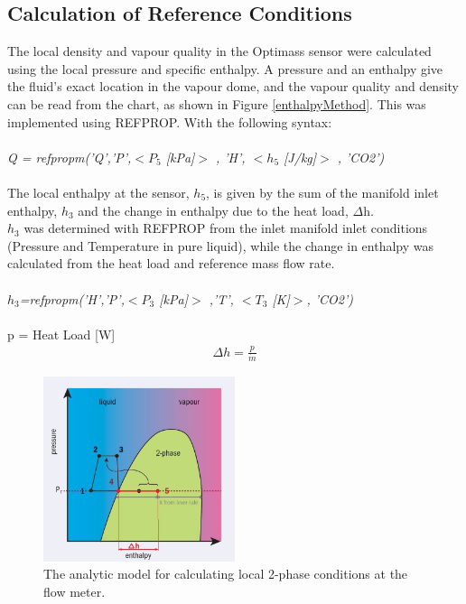 \documentclass{report}
\begin{document}
\subsection{Calculation of Reference Conditions}
The local density and vapour quality in the Optimass sensor were calculated using the local pressure and specific enthalpy. 
A pressure and an enthalpy give the fluid's exact location in the vapour dome, and the vapour quality and density can be read from the chart, as shown in Figure \ref{enthalpyMethod}. This was implemented using REFPROP. With the following syntax: \\\\
\textit{Q = refpropm('Q','P',$<P_5$ [kPa]$>$ , 'H', $<h_5$ [J/kg]$>$ , 'CO2')} \\\\
The local enthalpy at the sensor, \textit{$h_5$}, is given by the sum of the manifold inlet enthalpy, $h_3$ and the change in enthalpy due to the heat load, $\Delta$h.\\
\textit{$h_3$} was determined with REFPROP from the inlet manifold inlet conditions (Pressure and Temperature in pure liquid), while the change in enthalpy was calculated from the heat load and reference mass flow rate.\\\\
\textit{$h_3$=refpropm('H','P',$<P_3$ [kPa]$>$ ,'T', $<T_3$ [K]$>$, 'CO2')}\\\\
p = Heat Load [W]\\
\begin{eqnarray}
\Delta h=\frac{p}{\dot{m}}
\end{eqnarray}
\begin{figure}
\includegraphics[width=0.5\textwidth]{enthalpyMethod.jpg}
\caption{The analytic model for calculating local 2-phase conditions at the flow meter.}
\label{fig:enthalpyMethod}
\end{figure}
\end{document}
